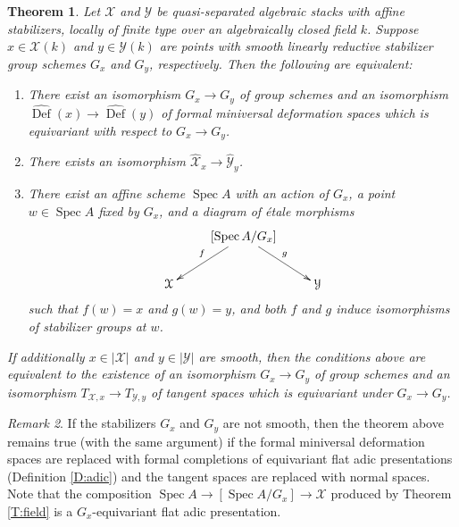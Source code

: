 \documentclass[a4paper]{amsart}
\theoremstyle{plain}
\newtheorem{theorem}{Theorem}[section]
\theoremstyle{definition}
\theoremstyle{remark}
\newtheorem{remark}[theorem]{Remark}
\numberwithin{equation}{section}
\newcommand\cX{\mathcal{X}}
\newcommand\cY{\mathcal{Y}}
\DeclareMathOperator{\Spec}{Spec}
\renewcommand{\hat}{\widehat}
\DeclareMathOperator{\Def}{Def}
\begin{document}
\begin{theorem} \label{T:etale}
  Let $\cX$ and $\cY$ be quasi-separated algebraic stacks with affine stabilizers, locally of finite type over an algebraically closed field $k$.  Suppose $x \in \cX(k)$ and $y \in \cY(k)$ are points with smooth linearly reductive stabilizer group schemes $G_x$ and $G_y$, respectively.  Then the following are equivalent:
  \begin{enumerate}
  	\item\label{TI:etale:miniversal}
      There exist an isomorphism $G_x \to G_y$ of group schemes and an isomorphism $\hat{\Def}(x) \to \hat{\Def}(y)$ of formal miniversal deformation spaces which is equivariant with respect to $G_x \to G_y$.
  	\item\label{TI:etale:completion}
	  There exists an isomorphism $\hat{\cX}_x \to \hat{\cY}_y$.
  	\item\label{TI:etale:etale}
	  There exist an affine scheme $\Spec A$ with an action of $G_x$, a point $w \in \Spec A$ fixed by $G_x$, and a diagram of
      \'etale morphisms
	$$\xymatrix{	
			& [\Spec A /G_x] \ar[ld]_f \ar[rd]^g \\
		\cX	&  & \cY
	}$$
	such that $f(w) = x$ and $g(w) = y$, and both $f$ and $g$ induce isomorphisms of stabilizer groups at $w$.
  \end{enumerate}
If additionally $x \in |\cX|$ and $y \in |\cY|$ are smooth, then the conditions above are equivalent to the existence of an isomorphism $G_x \to G_y$ of group schemes and an isomorphism $T_{\cX,x} \to T_{\cY,y}$ of tangent spaces which is equivariant under $G_x \to G_y$.
\end{theorem}

\begin{remark}  If the stabilizers $G_x$ and $G_y$ are not smooth, then the theorem above remains true (with the same argument) if the formal miniversal deformation spaces are replaced with formal completions of equivariant flat adic presentations (Definition \ref{D:adic}) and the tangent spaces are replaced with normal spaces.  Note that the composition $\Spec A \to [\Spec A/ G_x] \to \cX$ produced by Theorem \ref{T:field} is a $G_x$-equivariant flat adic presentation.
\end{remark}
\end{document}
